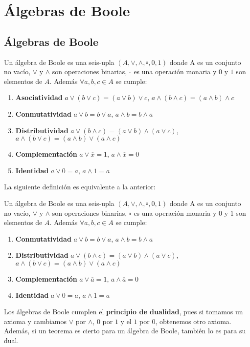 \newpage
\section{Álgebras de Boole}
\subsection{Álgebras de Boole}
\begin{ndef}
    Un álgebra de Boole es una seis-upla $(A, \lor, \land, \overline{\square}, 0, 1)$ donde A es un conjunto no vacío, $\lor$ y $\land$ son operaciones binarias, $\overline{\square}$ es una operación monaria y
    $0$ y $1$ son elementos de $A$. Además $\forall a,b,c \in A$ se cumple:
    \begin{enumerate}[label=\emph{A\arabic*}]
        \item\label{a0} \textbf{Asociatividad} $a \lor (b \lor c) = (a \lor b) \lor c$, $a \land (b \land c) = (a \land b) \land c$
        \item\label{a1} \textbf{Conmutatividad} $a \lor b = b \lor a$, $a \land b = b \land a$
        \item\label{a2} \textbf{Distributividad} $a \lor (b \land c) = (a \lor b) \land (a \lor c)$, $a \land (b \lor c) = (a \land b) \lor (a \land c)$
        \item\label{a3} \textbf{Complementación} $a \lor \overline{x} = 1$, $a \land \overline{x} = 0$
        \item\label{a4} \textbf{Identidad} $a \lor 0 = a$, $a \land 1 = a$
    \end{enumerate}
\end{ndef}
La siguiente definición es equivalente a la anterior:
\begin{ndef}[Huntington]
    Un álgebra de Boole es una seis-upla $(A, \lor, \land, \overline{\square}, 0, 1)$ donde A es un conjunto no vacío, $\lor$ y $\land$ son operaciones binarias, $\overline{\square}$ es una operación monaria y
    $0$ y $1$ son elementos de $A$. Además $\forall a,b,c \in A$ se cumple:
    \begin{enumerate}[label=\emph{A\arabic*}]
        \item\label{a1} \textbf{Conmutatividad} $a \lor b = b \lor a$, $a \land b = b \land a$
        \item\label{a2} \textbf{Distributividad} $a \lor (b \land c) = (a \lor b) \land (a \lor c)$, $a \land (b \lor c) = (a \land b) \lor (a \land c)$
        \item\label{a3} \textbf{Complementación} $a \lor \overline{a}  = 1$, $a \land \overline{a}  = 0$
        \item\label{a4} \textbf{Identidad} $a \lor 0 = a$, $a \land 1 = a$
    \end{enumerate}
\end{ndef}
\begin{nota}
    Los álgebras de Boole cumplen el \textbf{principio de dualidad}, pues si tomamos un axioma y cambiamos $\lor$ por $\land$, $0$ por $1$ y el $1$ por $0$, obtenemos otro axioma. Además,
    si un teorema es cierto para un álgebra de Boole, también lo es para su dual.
\end{nota}

